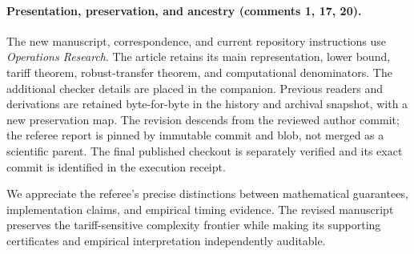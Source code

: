 \paragraph{Presentation, preservation, and ancestry (comments 1, 17, 20).}
The new manuscript, correspondence, and current repository instructions use \emph{Operations Research}. The article retains its main representation, lower bound, tariff theorem, robust-transfer theorem, and computational denominators. The additional checker details are placed in the companion. Previous readers and derivations are retained byte-for-byte in the history and archival snapshot, with a new preservation map. The revision descends from the reviewed author commit; the referee report is pinned by immutable commit and blob, not merged as a scientific parent. The final published checkout is separately verified and its exact commit is identified in the execution receipt.

We appreciate the referee's precise distinctions between mathematical guarantees, implementation claims, and empirical timing evidence. The revised manuscript preserves the tariff-sensitive complexity frontier while making its supporting certificates and empirical interpretation independently auditable.

